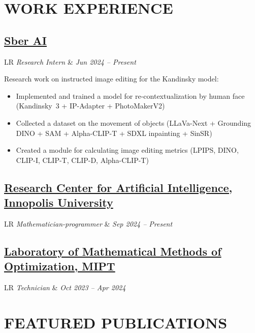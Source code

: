 \documentclass[11pt,a4paper]{moderncv}
\newcommand*{\experienceentry}[4][1.5mm]{
    \subsection{#2} \vspace{-1.5mm}
    \begin{tabularx}{\textwidth}{LR}
        {\itshape #3} & {\itshape #4}
    \end{tabularx}
    \par\addvspace{#1}
}
\begin{document}
\maketitle
\vspace{-3em}

\begin{minipage}[t]{0.62\textwidth}

\section{WORK EXPERIENCE}
\experienceentry{\href{https://ai.sber.ru/en/about}{Sber AI}}{Research Intern}{Jun 2024 -- Present}{
    Research work on instructed image editing for the Kandinsky model:
    \begin{itemize}
        \item Implemented and trained a model for re-contextualization by human face (Kandinsky~3 + IP-Adapter + PhotoMakerV2)
        \item Collected a dataset on the movement of objects (LLaVa-Next + Grounding DINO + SAM + Alpha-CLIP-T + SDXL inpainting + SinSR)
        \item Created a module for calculating image editing metrics (LPIPS, DINO, CLIP-I, CLIP-T, CLIP-D, Alpha-CLIP-T)
    \end{itemize}
}
\experienceentry{\href{https://innopolis.university/en/centerforartificialintelligence/}{Research Center for Artificial Intelligence, Innopolis University}}{Mathematician-programmer}{Sep 2024 -- Present}
\experienceentry{\href{https://labmmo.ru/en}{Laboratory of Mathematical Methods of Optimization, MIPT}}{Technician}{Oct 2023 -- Apr 2024}

\section{FEATURED PUBLICATIONS}


\end{minipage}
\end{document}
